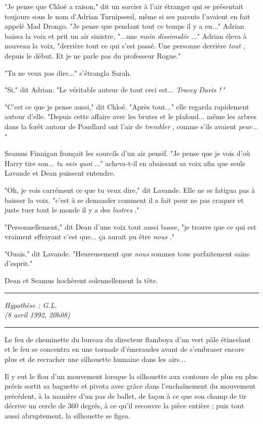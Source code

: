 "Je pense que Chloé a raison," dit un sorcier à l'air étranger qui se présentait toujours sous le nom d'Adrian Turnipseed, même si ses parents l'avaient en fait appelé Mad Drongo. "Je pense que pendant tout ce temps il y a eu..." Adrian baissa la voix et prit un air sinistre, "...une \emph{main dissimulée} ..." Adrian éleva à nouveau la voix, "derrière tout ce qui s'est passé. Une personne derrière \emph{tout} , depuis le début. Et je ne parle pas du professeur Rogue."

"Tu ne veux pas dire..." s'étrangla Sarah.

"Si," dit Adrian. "Le véritable auteur de tout ceci est... \emph{Tracey Davis !} "

"C'est ce que je pense aussi," dit Chloé. "Après tout..." elle regarda rapidement autour d'elle. "Depuis cette affaire avec les brutes et le plafond... même les arbres dans la forêt autour de Poudlard ont l'air de \emph{trembler} , comme s'ils avaient \emph{peur...} "

Seamus Finnigan fronçait les sourcils d'un air pensif. "Je pense que je vois d'où Harry tire son... \emph{tu sais quoi} ..." acheva-t-il en abaissant sa voix afin que seuls Lavande et Dean puissent entendre.

"Oh, je vois carrément ce que tu veux dire," dit Lavande. Elle ne se fatigua pas à baisser la voix. "c'est à se demander comment il a fait pour ne pas craquer et juste tuer tout le monde il y a des \emph{lustres} ."

"Personnellement," dit Dean d'une voix tout aussi basse, "je trouve que ce qui est vraiment effrayant c'est que... ça aurait pu être \emph{nous} ."

"Ouais," dit Lavande. "Heureusement que \emph{nous}  sommes tous parfaitement sains d'esprit."

Dean et Seamus hochèrent solennellement la tête.
\par\noindent\rule{\textwidth}{0.4pt}
\emph{Hypothèse : G.L.} \\\emph{} \emph{(8 avril 1992, 20h08)} 
\par\noindent\rule{\textwidth}{0.4pt}
Le feu de cheminette du bureau du directeur flamboya d'un vert pâle étincelant et le feu se concentra en une tornade d'émeraudes avant de s'embraser encore plus et de recracher une silhouette humaine dans les airs...

Il y eut le flou d'un mouvement lorsque la silhouette aux contours de plus en plus précis sortit sa baguette et pivota avec grâce dans l'enchaînement du mouvement précédent, à la manière d'un pas de ballet, de façon à ce que son champ de tir décrive un cercle de 360 degrés, à ce qu'il recouvre la pièce entière ; puis tout aussi abruptement, la silhouette se figea.

